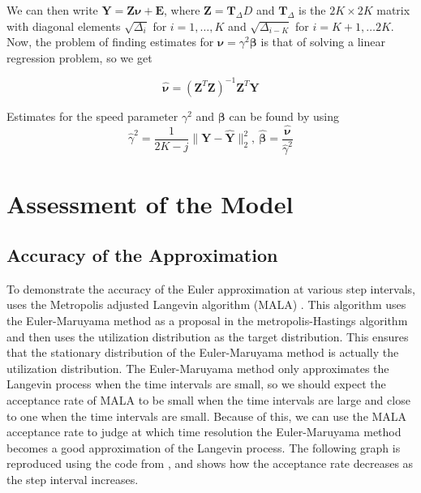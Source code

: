 We can then write $\mathbf{Y} = \mathbf{Z} \bm{\nu} + \mathbf{E}$, where $\mathbf{Z} = \mathbf{T}_\Delta D$ and $\mathbf{T}_\Delta$ is the $2K\times 2K$ matrix with diagonal elements $\sqrt{\Delta_i}$ for $i=1, \dots, K$ and $\sqrt{\Delta_{i-K}}$ for $i=K+1,\dots 2K$. Now, the problem of finding estimates for $\bm{\nu} = \gamma^2 \bm{\beta}$ is that of solving a linear regression problem, so we get

$$
\bm{\hat{\nu}} = (\mathbf{Z}^T\mathbf{Z})^{-1}\mathbf{Z}^T \mathbf{Y}
$$

Estimates for the speed parameter $\gamma^2$ and $\bm{\beta}$ can be found by using
$$
\hat{\gamma}^2 = \frac{1}{2K-j} \lVert \mathbf{Y} - \mathbf{\hat{Y}} \rVert^2_2, \ 
\bm{\hat{\beta}} = \frac{\bm{\hat{\nu}}}{\hat{\gamma}^2}
\label{eq: michelot estimates}
$$



\section{Assessment of the Model}

\subsection{Accuracy of the Approximation}
To demonstrate the accuracy of the Euler approximation at various step intervals, \parencite{michelot_langevin_2019} uses the Metropolis adjusted Langevin algorithm (MALA) \parencite{roberts_exponential_1996}. This algorithm uses the Euler-Maruyama method as a proposal in the metropolis-Hastings algorithm and then uses the utilization distribution as the target distribution. This ensures that the stationary distribution of the Euler-Maruyama method is actually the utilization distribution. The Euler-Maruyama method only approximates the Langevin process when the time intervals are small, so we should expect the acceptance rate of MALA to be small when the time intervals are large and close to one when the time intervals are small. Because of this, we can use the MALA acceptance rate to judge at which time resolution the Euler-Maruyama method becomes a good approximation of the Langevin process. The following graph is reproduced using the code from \parencite{michelot_langevin_2019}, and shows how the acceptance rate decreases as the step interval increases.

